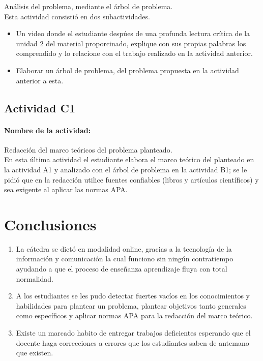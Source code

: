 \documentclass[a4paper,12pt]{article}
\begin{document}
Análisis del problema, mediante el árbol de problema.\\

Esta actividad consistió en dos subactividades.\\

\begin{itemize}
\item Un video donde el estudiante despúes de una profunda lectura crítica de la unidad 2 del material proporcinado, explique con sus propias palabras los comprendido y lo relacione con el trabajo realizado en la actividad anterior.
\item Elaborar un árbol de problema, del problema propuesta en la actividad anterior a esta.
\end{itemize}


\subsection{Actividad C1}
\label{sec:actividad-c1}

\paragraph{Nombre de la actividad:}

Redacción del marco teóricos del problema planteado.\\

En esta última actividad el estudiante elabora el marco teórico del planteado en la actividad A1 y analizado con el árbol de problema en la actividad B1; se le pidió que en la redacción utilice fuentes confiables (libros y artículos científicos) y sea exigente al aplicar las normas APA.

\section{Conclusiones}
\label{sec:conclusiones}

\begin{enumerate}
\item La cátedra se dictó en modalidad online, gracias a la tecnología de la información y comunicación la cual funciono sin ningún contratiempo ayudando a que el proceso de enseñanza aprendizaje fluya con total normalidad.
\item A los estudiantes se les pudo detectar fuertes vacíos en los conocimientos y habilidades para plantear un problema, plantear objetivos tanto generales como específicos y aplicar normas APA para la redacción del marco teórico.
\item Existe un marcado habito de entregar trabajos deficientes esperando que el docente haga correcciones a errores que los estudiantes saben de antemano que existen.
\end{enumerate}
\end{document}
